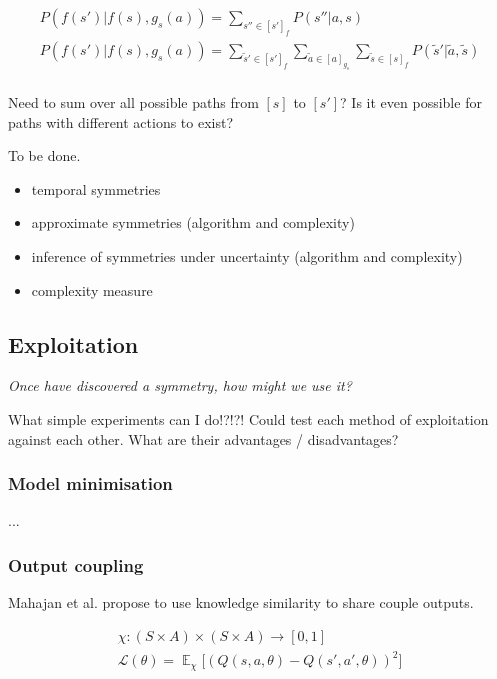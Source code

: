 \cite{Ravindran2002}

\begin{align}
P(f(s')|f(s), g_s(a)) = \sum_{s''\in [s']_f} P(s''| a, s) \\
P(f(s')|f(s), g_s(a)) = \sum_{\tilde s'\in [s']_f} \sum_{\tilde a \in [a]_{g_s}} \sum_{\tilde s \in [s]_f} P(\tilde s'| \tilde a, \tilde s) \\
\end{align}

Need to sum over all possible paths from $[s]$ to $[s']$?
Is it even possible for paths with different actions to exist?

To be done.

\begin{itemize}
\tightlist
  \item temporal symmetries
  \item approximate symmetries (algorithm and complexity)
  \item inference of symmetries under uncertainty (algorithm and complexity)
  \item complexity measure
\end{itemize}


\subsection{Exploitation}

\begin{displayquote}
\textit{Once have discovered a symmetry, how might we use it?}
\end{displayquote}

{\color{red}What simple experiments can I do!?!?!}
Could test each method of exploitation against each other. What are their advantages / disadvantages?

\subsubsection{Model minimisation}

...\cite{NARAYANAMURTHY}

\subsubsection{Output coupling}

Mahajan et al. propose to use knowledge similarity to share couple outputs.
\cite{Mahajan2017}

\begin{align*}
\chi: (S\times A) \times (S\times A) \to [0, 1] \\
\mathcal L(\theta) = \mathop{\mathbb E}_{\chi} \Big[(Q(s, a, \theta)-Q(s', a', \theta))^2 \Big]
\end{align*}

